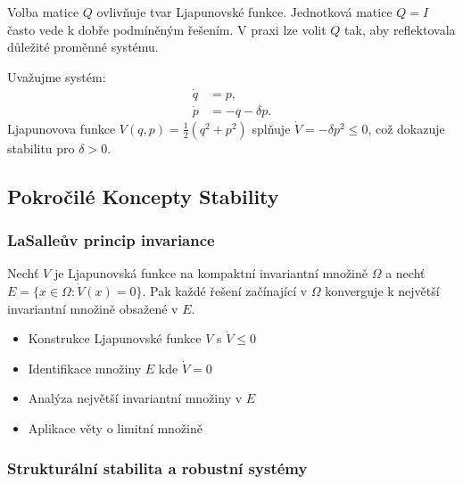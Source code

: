 \begin{intuition}
Volba matice $Q$ ovlivňuje tvar Ljapunovské funkce. Jednotková matice $Q = I$ často vede k dobře podmíněným řešením. V praxi lze volit $Q$ tak, aby reflektovala důležité proměnné systému.
\end{intuition}

\begin{example}
Uvažujme systém:
\begin{align*}
\dot{q} &= p, \\
\dot{p} &= -q - \delta p.
\end{align*}
Ljapunovova funkce $V(q,p) = \frac{1}{2}(q^2 + p^2)$ splňuje $\dot{V} = -\delta p^2 \leq 0$, což dokazuje stabilitu pro $\delta > 0$.
\end{example}

\spc

\subsection{Pokročilé Koncepty Stability}

\subsubsection{LaSalleův princip invariance}

\begin{theorem}
Nechť $V$ je Ljapunovská funkce na kompaktní invariantní množině $\Omega$ a nechť $E = \{x \in \Omega : \dot{V}(x) = 0\}$. Pak každé řešení začínající v $\Omega$ konverguje k největší invariantní množině obsažené v $E$.
\end{theorem}


\begin{proofsketch}
\begin{itemize}
\item Konstrukce Ljapunovské funkce $V$ s $\dot{V} \leq 0$
\item Identifikace množiny $E$ kde $\dot{V} = 0$
\item Analýza největší invariantní množiny v $E$
\item Aplikace věty o limitní množině
\end{itemize}
\end{proofsketch}

\subsubsection{Strukturální stabilita a robustní systémy}

